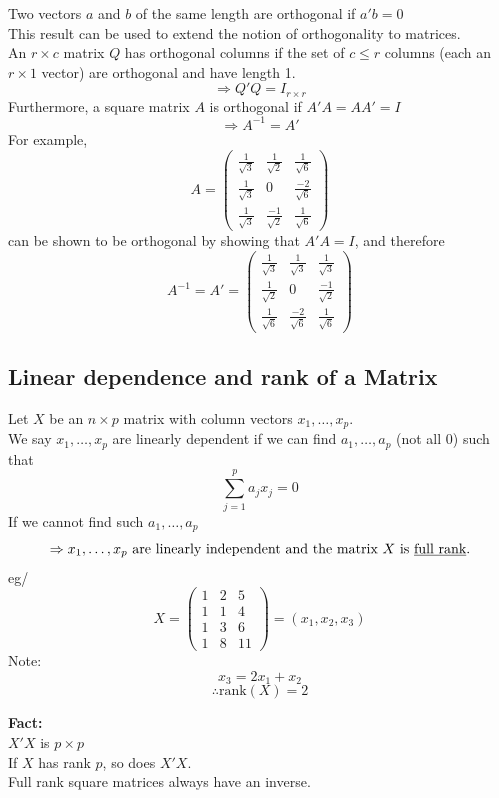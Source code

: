 \documentclass[14pt]{extarticle}
\begin{document}
\noindent
Two vectors $a$ and $b$ of the same length are orthogonal if $a'b = 0$\\
This result can be used to extend the notion of orthogonality to matrices.\\
An $r \times c$ matrix $Q$ has orthogonal columns if the set of $c \leq r$ columns (each an $r \times 1$ vector) are orthogonal and have length 1.
\[
\Rightarrow Q'Q = I_{r \times r}
\]
Furthermore, a square matrix $A$ is orthogonal if $A'A = AA' = I$
\[
\Rightarrow A^{-1} = A'
\]
For example,
\[
A = \begin{pmatrix}
\frac{1}{\sqrt{3}} & \frac{1}{\sqrt{2}} & \frac{1}{\sqrt{6}} \\
\frac{1}{\sqrt{3}} & 0 & \frac{-2}{\sqrt{6}} \\
\frac{1}{\sqrt{3}} & \frac{-1}{\sqrt{2}} & \frac{1}{\sqrt{6}}
\end{pmatrix}
\]
can be shown to be orthogonal by showing that $A'A = I$, and therefore
\[
A^{-1} = A' = 
\begin{pmatrix}
\frac{1}{\sqrt{3}} & \frac{1}{\sqrt{3}} & \frac{1}{\sqrt{3}} \\
\frac{1}{\sqrt{2}} & 0 & \frac{-1}{\sqrt{2}} \\
\frac{1}{\sqrt{6}} & \frac{-2}{\sqrt{6}} & \frac{1}{\sqrt{6}}
\end{pmatrix}
\]

\bigskip

\subsection*{Linear dependence and rank of a Matrix}
\noindent
Let $X$ be an $n \times p$ matrix with column vectors $x_1, \dots, x_p$.\\
We say $x_1, \dots, x_p$ are linearly dependent if we can find $a_1, \dots, a_p$ (not all 0) such that
\[
\sum_{j=1}^{p} a_j x_j = 0
\]
If we cannot find such $a_1, \dots, a_p$
\[
\Rightarrow x_1, \dots, x_p \text{ are linearly independent and the matrix } X \text{ is \underline{full rank}.}
\]
eg/
\[
X = \begin{pmatrix}
1 & 2 & 5 \\
1 & 1 & 4 \\
1 & 3 & 6 \\
1 & 8 & 11
\end{pmatrix}
= (x_1, x_2, x_3)
\]
Note: 
\[
x_3 = 2x_1 + x_2
\]
\[
\therefore \text{rank}(X) = 2
\]

\noindent
\textbf{Fact:}\\
$X'X$ is $p \times p$\\
If $X$ has rank $p$, so does $X'X$.\\
Full rank square matrices always have an inverse.
\end{document}
